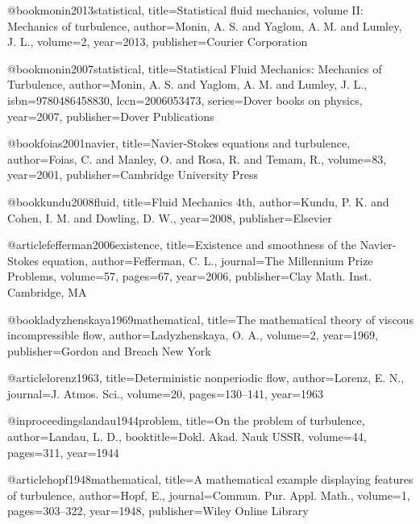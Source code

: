   @book{monin2013statistical,
    title={{Statistical fluid mechanics, volume II: Mechanics of turbulence}},
    author={Monin, A. S. and Yaglom, A. M. and Lumley, J. L.},
    volume={2},
    year={2013},
    publisher={Courier Corporation}
  }

  @book{monin2007statistical,
    title={{Statistical Fluid Mechanics: Mechanics of Turbulence}},
    author={Monin, A. S. and Yaglom, A. M. and Lumley, J. L.},
    isbn={9780486458830},
    lccn={2006053473},
    series={Dover books on physics},
    year={2007},
    publisher={Dover Publications}
  }

  @book{foias2001navier,
    title={{Navier-Stokes equations and turbulence}},
    author={Foias, C. and Manley, O. and Rosa, R. and Temam, R.},
    volume={83},
    year={2001},
    publisher={Cambridge University Press}
  }

  @book{kundu2008fluid,
    title={{Fluid Mechanics 4th}},
    author={Kundu, P. K. and Cohen, I. M. and Dowling, D. W.},
    year={2008},
    publisher={Elsevier}
  }


  @article{fefferman2006existence,
    title={{Existence and smoothness of the Navier-Stokes equation}},
    author={Fefferman, C. L.},
    journal={The Millennium Prize Problems},
    volume={57},
    pages={67},
    year={2006},
    publisher={Clay Math. Inst. Cambridge, MA}
  }

  @book{ladyzhenskaya1969mathematical,
    title={{The mathematical theory of viscous incompressible flow}},
    author={Ladyzhenskaya, O. A.},
    volume={2},
    year={1969},
    publisher={Gordon and Breach New York}
  }


  @article{lorenz1963,
    title={{Deterministic nonperiodic flow}},
    author={Lorenz, E. N.},
    journal={J. Atmos. Sci.},
    volume={20},
    pages={130--141},
    year={1963}
  }


  @inproceedings{landau1944problem,
    title={{On the problem of turbulence}},
    author={Landau, L. D.},
    booktitle={Dokl. Akad. Nauk USSR},
    volume={44},
    pages={311},
    year={1944}
  }

  @article{hopf1948mathematical,
    title={{A mathematical example displaying features of turbulence}},
    author={Hopf, E.},
    journal={Commun. Pur. Appl. Math.},
    volume={1},
    pages={303--322},
    year={1948},
    publisher={Wiley Online Library}
  }

